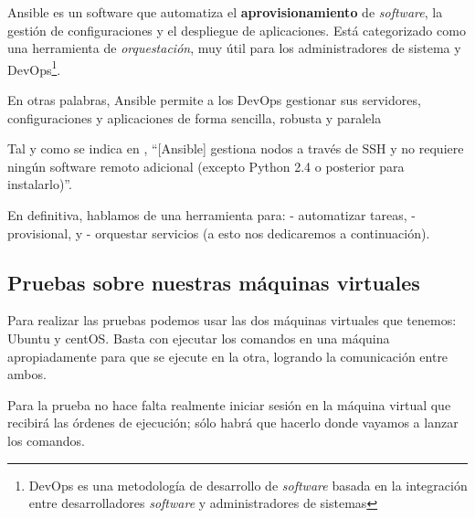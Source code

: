\documentclass[
]{memoir}
\begin{document}
Ansible es un software que automatiza el \textbf{aprovisionamiento} de \emph{software}, la gestión de configuraciones y el despliegue de aplicaciones. Está categorizado como una herramienta de \emph{orquestación}, muy útil para los administradores de sistema y DevOps\footnote{DevOps es una metodología de desarrollo de \emph{software} basada en la integración entre desarrolladores \emph{software} y administradores de sistemas}.

En otras palabras, Ansible permite a los DevOps gestionar sus servidores, configuraciones y aplicaciones de forma sencilla, robusta y paralela

Tal y como se indica en , ``{[}Ansible{]} gestiona nodos a través de SSH y no requiere ningún software remoto adicional (excepto Python 2.4 o posterior para instalarlo)''.

En definitiva, hablamos de una herramienta para:
- automatizar tareas,
- provisional, y
- orquestar servicios (a esto nos dedicaremos a continuación).

\hypertarget{pruebas-sobre-nuestras-muxe1quinas-virtuales}{%
\subsection{Pruebas sobre nuestras máquinas virtuales}\label{pruebas-sobre-nuestras-muxe1quinas-virtuales}}

Para realizar las pruebas podemos usar las dos máquinas virtuales que tenemos: Ubuntu y centOS. Basta con ejecutar los comandos en una máquina apropiadamente para que se ejecute en la otra, logrando la comunicación entre ambos.

Para la prueba no hace falta realmente iniciar sesión en la máquina virtual que recibirá las órdenes de ejecución; sólo habrá que hacerlo donde vayamos a lanzar los comandos.
\end{document}
